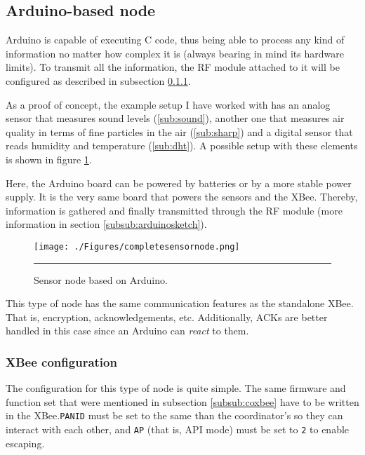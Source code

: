 \subsection{Arduino-based node}

Arduino is capable of executing C code, thus being able to process any kind of information no matter how complex it is (always bearing in mind its hardware limits). To transmit all the information, the RF module attached to it will be configured as described in subsection \ref{sub:xbeearduino}.

As a proof of concept, the example setup I have worked with has an analog sensor that measures sound levels (\ref{sub:sound}), another one that measures air quality in terms of fine particles in the air (\ref{sub:sharp}) and a digital sensor that reads humidity and temperature (\ref{sub:dht}). A possible setup with these elements is shown in figure \ref{fig:ArduinoNode}.

Here, the Arduino board can be powered by batteries or by a more stable power supply. It is the very same board that powers the sensors and the XBee\textregistered{}. Thereby, information is gathered and finally transmitted through the RF module (more information in section \ref{subsub:arduinosketch}).

\begin{figure}[htbp]
    \centering
        \texttt{[image: ./Figures/completesensornode.png]}
        \rule{35em}{0.5pt}
    \caption[Arduino-based node schematic]{Sensor node based on Arduino.}
    \label{fig:ArduinoNode}
\end{figure}

This type of node has the same communication features as the standalone XBee. That is, encryption, acknowledgements, etc. Additionally, ACKs are better handled in this case since an Arduino can \emph{react} to them.

\subsubsection{XBee\textregistered{} configuration}
\label{sub:xbeearduino}

The configuration for this type of node is quite simple. The same firmware and function set that were mentioned in subsection \ref{subsub:coxbee} have to be written in the XBee\textregistered{}.\texttt{PANID} must be set to the same than the coordinator's so they can interact with each other, and \texttt{AP} (that is, API mode) must be set to \texttt{2} to enable escaping.

